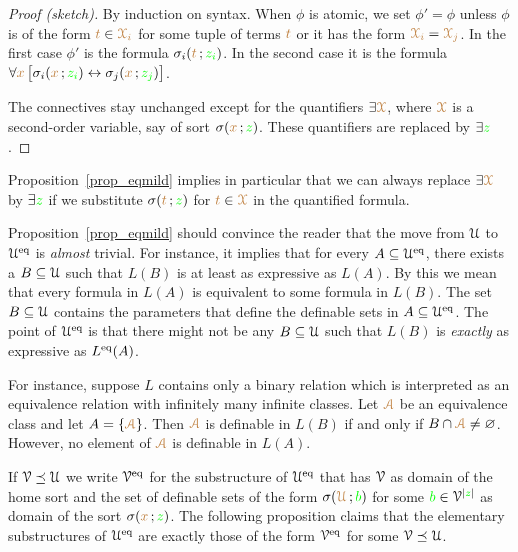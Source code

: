 \documentclass[creche.tex]{subfiles}
\begin{document}
\begin{proof}[Proof (sketch)]
By induction on syntax.
When $\phi$ is atomic, we set $\phi'=\phi$ unless $\phi$ is of the form ${\color{brown} t}\in {\color{brown}\EuScript X_i}$ for some tuple of terms ${\color{brown} t}$ or it has the form ${\color{brown}\EuScript X_i}={\color{brown}\EuScript X_j}$.
In the first case $\phi'$ is the formula $\sigma_i({\color{brown} t}\,;{\color{green} z_i})$.
In the second case it is the formula $\forall {\color{brown}x}\,\big[\sigma_i({\color{brown} x}\,;{\color{green} z_i}) \leftrightarrow\sigma_j({\color{brown} x}\,;{\color{green} z_j})\big]$. 

The connectives stay unchanged except for the quantifiers $\exists {\color{brown}\EuScript X}$, where ${\color{brown}\EuScript X}$ is a second-order variable, say of sort $\sigma({\color{brown} x}\,;{\color{green} z})$.
These quantifiers are replaced by $\exists{\color{green}z}$.
\end{proof}

Proposition~\ref{prop_eqmild} implies in particular that we can always replace $\exists {\color{brown}\EuScript X}$ by $\exists {\color{green}z}$ if we substitute $\sigma({\color{brown} t}\,;{\color{green} z})$ for ${\color{brown} t}\in {\color{brown}\EuScript X}$ in the quantified formula.



\begin{remark}\label{rem_eqmild}
Proposition~\ref{prop_eqmild} should convince the reader that the move from $\EuScript U$ to $\EuScript U^{{\rm eq}}$ is \textit{almost\/} trivial.
For instance, it implies that for every $A\subseteq\EuScript U^{{\rm eq}}$, there exists a $B\subseteq\EuScript U$ such that $L(B)$ is at least as expressive as $L(A)$.
By this we mean that every formula in $L(A)$ is equivalent to some formula in $L(B)$.
The set $B\subseteq\EuScript U$ contains the parameters that define the definable sets in $A\subseteq\EuScript U^{{\rm eq}}$.
The point of $\EuScript U^{{\rm eq}}$ is that there might not be any $B\subseteq\EuScript U$ such that $L(B)$ is \textit{exactly\/} as expressive as $L^{{\rm eq}}(A)$.

For instance, suppose $L$ contains only a binary relation which is interpreted as an equivalence relation with infinitely many infinite classes.
Let ${\color{brown}\EuScript A}$ be an equivalence class and let $A=\{{\color{brown}\EuScript A}\}$.
Then ${\color{brown}\EuScript A}$ is definable in $L(B)$ if and only if $B\cap {\color{brown}\EuScript A}\neq\varnothing$.
However, no element of ${\color{brown}\EuScript A}$ is definable in $L(A)$.\QED
\end{remark}

If $\EuScript V\preceq\EuScript U$ we write \emph{$\EuScript V^{{{\rm eq}}}$\/} for the substructure of $\EuScript U^{{\rm eq}}$ that has $\EuScript V$ as domain of the home sort and  the set of definable sets of the form $\sigma({\color{brown}\EuScript U}\,;{\color{green} b})$ for some ${\color{green} b}\in \EuScript V^{|{\color{green} z}|}$ as domain of the sort $\sigma({\color{brown} x}\,;{\color{green} z})$.
The following proposition claims that the elementary substructures of $\EuScript U^{{\rm eq}}$ are exactly those of the form $\EuScript V^{{\rm eq}}$ for some $\EuScript V\preceq\EuScript U$.
\end{document}
